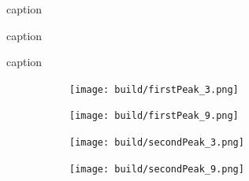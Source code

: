 \begin{table}[h]
	\centering
	\caption{caption}
	\label{tab:label}
	\begin{subtable}[t]{0.4\textwidth}
	\centering
	\caption{caption}
		
	\end{subtable}
	\begin{subtable}[t]{0.4\textwidth}
	\centering
	\caption{caption}
		
	\end{subtable}
\end{table}

\begin{figure}[h]
	\centering
	\begin{subfigure}[c]{0.45\textwidth}
	\begin{center}
		\texttt{[image: build/firstPeak\_3.png]}
	\end{center}
	\caption{}
	\label{fig:}
	\end{subfigure}
	\begin{subfigure}[c]{0.45\textwidth}
	\begin{center}
		\texttt{[image: build/firstPeak\_9.png]}
	\end{center}
	\caption{}
	\label{fig:}
	\end{subfigure}

	\begin{subfigure}[c]{0.45\textwidth}
	\begin{center}
		\texttt{[image: build/secondPeak\_3.png]}
	\end{center}
	\caption{}
	\label{fig:}
	\end{subfigure}
	\begin{subfigure}[c]{0.45\textwidth}
	\begin{center}
		\texttt{[image: build/secondPeak\_9.png]}
	\end{center}
	\caption{}
	\label{fig:}
	\end{subfigure}
	\caption{}
	\label{fig:}
\end{figure}
